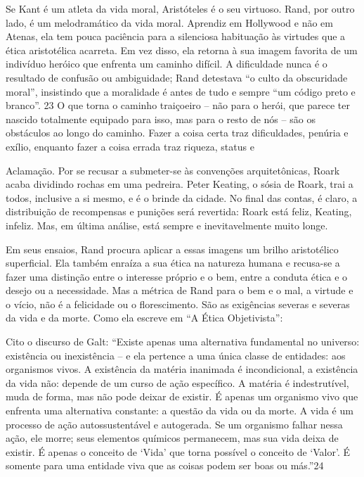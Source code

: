  \par 
Se Kant é um atleta da vida moral, Aristóteles é o seu virtuoso. Rand, por outro lado, é um melodramático da vida moral. Aprendiz em Hollywood e não em Atenas, ela tem pouca paciência para a silenciosa habituação às virtudes que a ética aristotélica acarreta. Em vez disso, ela retorna à sua imagem favorita de um indivíduo heróico que enfrenta um caminho difícil. A dificuldade nunca é o resultado de confusão ou ambiguidade; Rand detestava “o culto da obscuridade moral”, insistindo que a moralidade é antes de tudo e sempre “um código preto e branco”. {\color{blue}23} O que torna o caminho traiçoeiro – não para o herói, que parece ter nascido totalmente equipado para isso, mas para o resto de nós – são os obstáculos ao longo do caminho. Fazer a coisa certa traz dificuldades, penúria e exílio, enquanto fazer a coisa errada traz riqueza, status e
 \par 
Aclamação. Por se recusar a submeter-se às convenções arquitetônicas, Roark acaba dividindo rochas em uma pedreira. Peter Keating, o sósia de Roark, trai a todos, inclusive a si mesmo, e é o brinde da cidade. No final das contas, é claro, a distribuição de recompensas e punições será revertida: Roark está feliz, Keating, infeliz. Mas, em última análise, está sempre e inevitavelmente muito longe.
 \par 
Em seus ensaios, Rand procura aplicar a essas imagens um brilho aristotélico superficial. Ela também enraíza a sua ética na natureza humana e recusa-se a fazer uma distinção entre o interesse próprio e o bem, entre a conduta ética e o desejo ou a necessidade. Mas a métrica de Rand para o bem e o mal, a virtude e o vício, não é a felicidade ou o florescimento. São as exigências severas e severas da vida e da morte. Como ela escreve em “A Ética Objetivista”:
 \par 
Cito o discurso de Galt: “Existe apenas uma alternativa fundamental no universo: existência ou inexistência – e ela pertence a uma única classe de entidades: aos organismos vivos. A existência da matéria inanimada é incondicional, a existência da vida não: depende de um curso de ação específico. A matéria é indestrutível, muda de forma, mas não pode deixar de existir. É apenas um organismo vivo que enfrenta uma alternativa constante: a questão da vida ou da morte. A vida é um processo de ação autossustentável e autogerada. Se um organismo falhar nessa ação, ele morre; seus elementos químicos permanecem, mas sua vida deixa de existir. É apenas o conceito de ‘Vida’ que torna possível o conceito de ‘Valor’. É somente para uma entidade viva que as coisas podem ser boas ou más.”{\color{blue}24}
